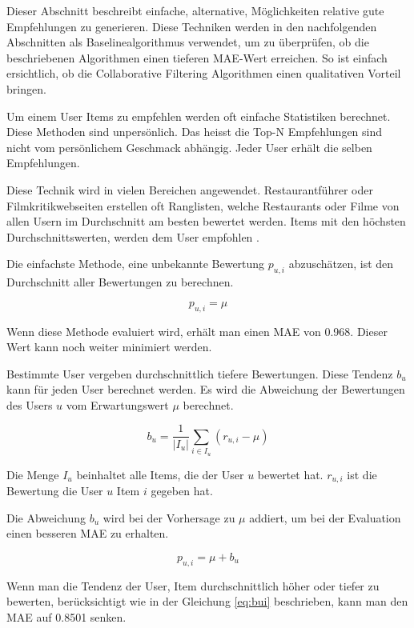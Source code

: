 \documentclass[a4paper, 12pt]{article}
\begin{document}
Dieser Abschnitt beschreibt einfache, alternative, Möglichkeiten relative gute Empfehlungen zu generieren. Diese Techniken werden in den nachfolgenden Abschnitten als Baselinealgorithmus verwendet, um zu überprüfen, ob die beschriebenen Algorithmen einen tieferen MAE-Wert erreichen. So ist einfach ersichtlich, ob die Collaborative Filtering Algorithmen einen qualitativen Vorteil bringen.

Um einem User Items zu empfehlen werden oft einfache Statistiken berechnet. Diese Methoden sind unpersönlich. Das heisst die Top-N Empfehlungen sind nicht vom persönlichem Geschmack abhängig. Jeder User erhält die selben Empfehlungen. 

Diese Technik wird in vielen Bereichen angewendet. Restaurantführer oder Filmkritikwebseiten erstellen oft Ranglisten, welche Restaurants oder Filme von allen Usern im Durchschnitt am besten bewertet werden. Items mit den höchsten Durchschnittswerten, werden dem User empfohlen \cite{jannach11}.

Die einfachste Methode, eine unbekannte Bewertung $p_{u,i}$ abzuschätzen, ist den Durchschnitt aller Bewertungen zu berechnen.

\begin{equation}
  \label{eq:avg}
  p_{u,i} = \mu
\end{equation}

Wenn diese Methode evaluiert wird, erhält man einen MAE von 0.968. Dieser Wert kann noch weiter minimiert werden.

Bestimmte User vergeben durchschnittlich tiefere Bewertungen. Diese Tendenz $b_u$ kann für jeden User berechnet werden. Es wird die Abweichung der Bewertungen des Users $u$ vom Erwartungswert $\mu$ berechnet.

\begin{equation}
  b_u = \frac{1}{|I_u|}\sum_{i \in I_u}(r_{u,i} - \mu)
\end{equation}

Die Menge $I_u$ beinhaltet alle Items, die der User $u$ bewertet hat. $r_{u,i}$ ist die Bewertung die User $u$ Item $i$ gegeben hat.

Die Abweichung $b_u$ wird bei der Vorhersage zu $\mu$ addiert, um bei der Evaluation einen besseren MAE zu erhalten.

\begin{equation}
  \label{eq:bui}
  p_{u,i} = \mu + b_u
\end{equation}

Wenn man die Tendenz der User, Item durchschnittlich höher oder tiefer zu bewerten, berücksichtigt wie in der Gleichung \ref{eq:bui} beschrieben, kann man den MAE auf 0.8501 senken. 
\end{document}
